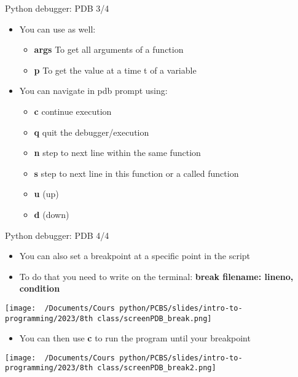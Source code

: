 \documentclass[
  8pt,
  ignorenonframetext,
]{beamer}
\providecommand{\tightlist}{%
  \setlength{\itemsep}{0pt}\setlength{\parskip}{0pt}}
\begin{document}
\begin{frame}{Python debugger: PDB 3/4}
\protect\hypertarget{python-debugger-pdb-34}{}
\begin{itemize}
\tightlist
\item
  You can use as well:

  \begin{itemize}
  \tightlist
  \item
    \textbf{args} To get all arguments of a function
  \item
    \textbf{p} To get the value at a time t of a variable
  \end{itemize}
\item
  You can navigate in pdb prompt using:

  \begin{itemize}
  \tightlist
  \item
    \textbf{c} continue execution
  \item
    \textbf{q} quit the debugger/execution
  \item
    \textbf{n} step to next line within the same function
  \item
    \textbf{s} step to next line in this function or a called function
  \item
    \textbf{u} (up)
  \item
    \textbf{d} (down)
  \end{itemize}
\end{itemize}
\end{frame}

\begin{frame}{Python debugger: PDB 4/4}
\protect\hypertarget{python-debugger-pdb-44}{}
\begin{itemize}
\item
  You can also set a breakpoint at a specific point in the script
\item
  To do that you need to write on the terminal: \textbf{break filename:
  lineno, condition}
\end{itemize}

\texttt{[image: ~/Documents/Cours python/PCBS/slides/intro-to-programming/2023/8th class/screenPDB\_break.png]}

\begin{itemize}
\tightlist
\item
  You can then use \textbf{c} to run the program until your breakpoint
\end{itemize}

\texttt{[image: ~/Documents/Cours python/PCBS/slides/intro-to-programming/2023/8th class/screenPDB\_break2.png]}
\end{frame}
\end{document}
